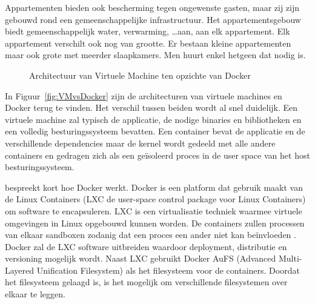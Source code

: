 Appartementen bieden ook bescherming tegen ongewenste gasten, maar zij zijn gebouwd rond een gemeenschappelijke infrastructuur.
Het appartementsgebouw biedt gemeenschappelijk water, verwarming, \ldots  aan, aan elk appartement.
Elk appartement verschilt ook nog van grootte.
Er bestaan kleine appartementen maar ook grote met meerder slaapkamers.
Men huurt enkel hetgeen dat nodig is.

\begin{figure}[!ht]
\centering
{}
\caption{Architectuur van Virtuele Machine ten opzichte van Docker \citep{dockerMain}}
\label{fig:VMvsDocker}
\end{figure}

In Figuur~\vref{fig:VMvsDocker} zijn de architecturen van virtuele machines en Docker terug te vinden.
Het verschil tussen beiden wordt al snel duidelijk.
Een virtuele machine zal typisch de applicatie, de nodige binaries en bibliotheken en een volledig besturingssysteem bevatten.
Een container bevat de applicatie en de verschillende dependencies maar de kernel wordt gedeeld met alle andere containers en gedragen zich als een geïsoleerd proces in de user space van het host besturingssysteem.

\citet{chamberlain2014using} bespreekt kort hoe Docker werkt.
Docker is een platform dat gebruik maakt van de Linux Containers (LXC de user-space control package voor Linux Containers) om software te encapsuleren.
LXC is een virtualisatie techniek waarmee virtuele omgevingen in Linux opgebouwd kunnen worden.
De containers zullen processen van elkaar sandboxen zodanig dat een proces een ander niet kan beïnvloeden \citep{merkel2014docker}.
Docker zal de LXC software uitbreiden waardoor deployment, distributie en versioning mogelijk wordt.
Naast LXC gebruikt Docker AuFS (Advanced Multi-Layered Unification Filesystem) als het filesysteem voor de containers.
Doordat het filesysteem gelaagd is, is het mogelijk om verschillende filesystemen over elkaar te leggen.

